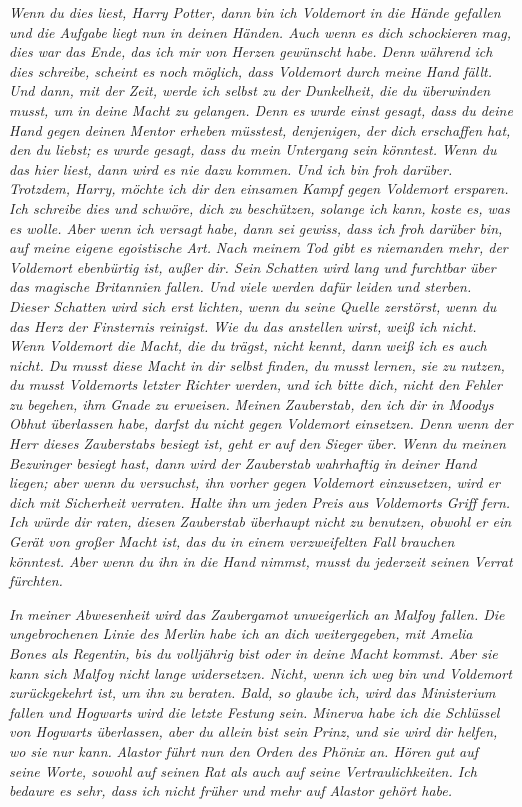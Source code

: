 \emph{Wenn du dies liest, Harry Potter, dann bin ich Voldemort in die Hände
gefallen und die Aufgabe liegt nun in deinen Händen. Auch wenn es dich
schockieren mag, dies war das Ende, das ich mir von Herzen gewünscht habe. Denn
während ich dies schreibe, scheint es noch möglich, dass Voldemort durch meine
Hand fällt. Und dann, mit der Zeit, werde ich selbst zu der Dunkelheit, die du
überwinden musst, um in deine Macht zu gelangen. Denn es wurde einst gesagt,
dass du deine Hand gegen deinen Mentor erheben müsstest, denjenigen, der dich
erschaffen hat, den du liebst; es wurde gesagt, dass du mein Untergang sein
könntest.} \emph{ Wenn du das hier liest, dann wird es nie dazu kommen. Und ich
bin froh darüber. Trotzdem, Harry, möchte ich dir den einsamen Kampf gegen
Voldemort ersparen. Ich schreibe dies und schwöre, dich zu beschützen, solange
ich kann, koste es, was es wolle. Aber wenn ich versagt habe, dann sei gewiss,
dass ich froh darüber bin, auf meine eigene egoistische Art.} \emph{ Nach meinem
Tod gibt es niemanden mehr, der Voldemort ebenbürtig ist, außer dir. Sein
Schatten wird lang und furchtbar über das magische Britannien fallen. Und viele
werden dafür leiden und sterben. Dieser Schatten wird sich erst lichten, wenn du
seine Quelle zerstörst, wenn du das Herz der Finsternis reinigst. Wie du das
anstellen wirst, weiß ich nicht. Wenn Voldemort die Macht, die du trägst, nicht
kennt, dann weiß ich es auch nicht. Du musst diese Macht in dir selbst finden,
du musst lernen, sie zu nutzen, du musst Voldemorts letzter Richter werden, und
ich bitte dich, nicht den Fehler zu begehen, ihm Gnade zu erweisen.} \emph{
Meinen Zauberstab, den ich dir in Moodys Obhut überlassen habe, darfst du nicht
gegen Voldemort einsetzen. Denn wenn der Herr dieses Zauberstabs besiegt ist,
geht er auf den Sieger über. Wenn du meinen Bezwinger besiegt hast, dann wird
der Zauberstab wahrhaftig in deiner Hand liegen; aber wenn du versuchst, ihn
vorher gegen Voldemort einzusetzen, wird er dich mit Sicherheit verraten. Halte
ihn um jeden Preis aus Voldemorts Griff fern. Ich würde dir raten, diesen
Zauberstab überhaupt nicht zu benutzen, obwohl er ein Gerät von großer Macht
ist, das du in einem verzweifelten Fall brauchen könntest. Aber wenn du ihn in
die Hand nimmst, musst du jederzeit seinen Verrat fürchten. }

\emph{In meiner Abwesenheit wird das Zaubergamot unweigerlich an Malfoy fallen. Die ungebrochenen Linie des Merlin habe ich an dich weitergegeben, mit Amelia Bones als Regentin, bis du volljährig bist oder in deine Macht kommst. Aber sie kann sich Malfoy nicht lange widersetzen. Nicht, wenn ich weg bin und Voldemort zurückgekehrt ist, um ihn zu beraten. Bald, so glaube ich, wird das Ministerium fallen und Hogwarts wird die letzte Festung sein. Minerva habe ich die Schlüssel von Hogwarts überlassen, aber du allein bist sein Prinz, und sie wird dir helfen, wo sie nur kann.}
\emph{ Alastor führt nun den Orden des Phönix an. Hören gut auf seine Worte,
sowohl auf seinen Rat als auch auf seine Vertraulichkeiten. Ich bedaure es sehr,
dass ich nicht früher und mehr auf Alastor gehört habe. }

